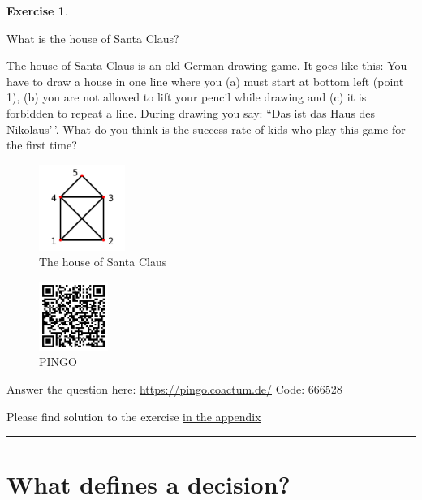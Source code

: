 \documentclass[
  12pt,
  oneside]{book}
\theoremstyle{definition}
\theoremstyle{definition}
\theoremstyle{definition}
\newtheorem{exercise}{Exercise}[chapter]
\theoremstyle{definition}
\theoremstyle{remark}
\begin{document}
\begin{exercise}
\protect\hypertarget{exr:santa}{}\label{exr:santa}

What is the house of Santa Claus?

The house of Santa Claus is an old German drawing game. It goes like this: You have to draw a house in one line where you (a) must start at bottom left (point 1), (b) you are not allowed to lift your pencil while drawing and (c) it is forbidden to repeat a line. During drawing you say: ``Das ist das Haus des Nikolaus'\,'. What do you think is the success-rate of kids who play this game for the first time?

\begin{figure}
\centering
\includegraphics[width=0.25\textwidth,height=\textheight]{fig/nikolaus.png}
\caption{\label{fig:nikolaus} The house of Santa Claus}
\end{figure}

\begin{figure}
\centering
\includegraphics[width=0.2\textwidth,height=\textheight]{fig/pingo666528.png}
\caption{\label{fig:pingo} PINGO}
\end{figure}

Answer the question here:
\url{https://pingo.coactum.de/}
Code: 666528

Please find solution to the exercise \hyperref[sol:santa]{in the appendix}

\begin{center}\rule{0.5\linewidth}{0.5pt}\end{center}

\end{exercise}

\section{What defines a decision?}\label{what-defines-a-decision}
\end{document}
